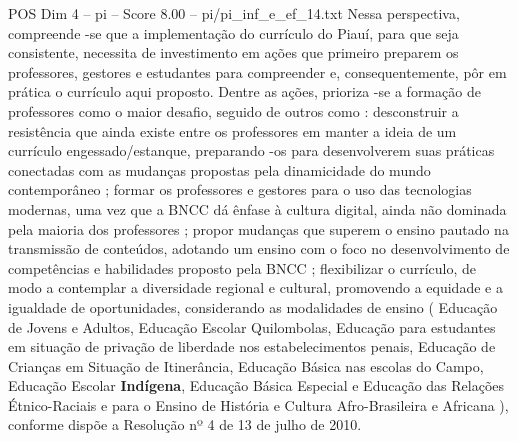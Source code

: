 \begin{textsample}{POS Dim 4 – pi – Score 8.00 – pi/pi\_inf\_e\_ef\_14.txt}
Nessa perspectiva, compreende -se que a implementação do currículo do Piauí, para que seja consistente, necessita de investimento em ações que primeiro preparem os professores, gestores e estudantes para compreender e, consequentemente, pôr em prática o currículo aqui proposto.
Dentre as ações, prioriza -se a formação de professores como o maior desafio, seguido de outros como : desconstruir a resistência que ainda existe entre os professores em manter a ideia de um currículo engessado/estanque, preparando -os para desenvolverem suas práticas conectadas com as mudanças propostas pela dinamicidade do mundo contemporâneo ; formar os professores e gestores para o uso das tecnologias modernas, uma vez que a BNCC dá ênfase à cultura digital, ainda não dominada pela maioria dos professores ; propor mudanças que superem o ensino pautado na transmissão de conteúdos, adotando um ensino com o foco no desenvolvimento de competências e habilidades proposto pela BNCC ; flexibilizar o currículo, de modo a contemplar a diversidade regional e cultural, promovendo a equidade e a igualdade de oportunidades, considerando as modalidades de ensino ( Educação de Jovens e Adultos, Educação Escolar Quilombolas, Educação para estudantes em situação de privação de liberdade nos estabelecimentos penais, Educação de Crianças em Situação de Itinerância, Educação Básica nas escolas do Campo, Educação Escolar \textbf{Indígena}, Educação Básica Especial e Educação das Relações Étnico-Raciais e para o Ensino de História e Cultura Afro-Brasileira e Africana ), conforme dispõe a Resolução nº 4 de 13 de julho de 2010.

\end{textsample}
